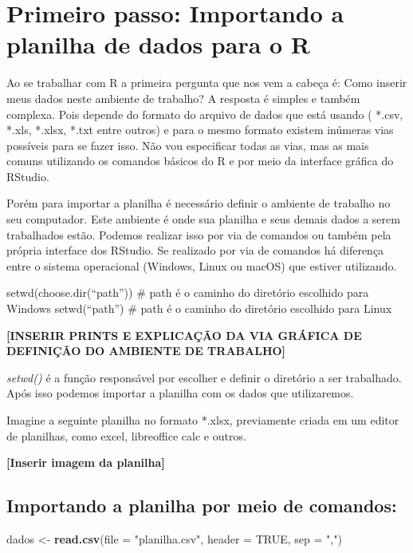 \documentclass[]{book}
\newenvironment{Shaded}{\begin{snugshade}}{\end{snugshade}}
\newcommand{\DataTypeTok}[1]{\textcolor[rgb]{0.13,0.29,0.53}{#1}}
\newcommand{\KeywordTok}[1]{\textcolor[rgb]{0.13,0.29,0.53}{\textbf{#1}}}
\newcommand{\NormalTok}[1]{#1}
\newcommand{\OtherTok}[1]{\textcolor[rgb]{0.56,0.35,0.01}{#1}}
\newcommand{\StringTok}[1]{\textcolor[rgb]{0.31,0.60,0.02}{#1}}
\begin{document}
\hypertarget{primeiro-passo-importando-a-planilha-de-dados-para-o-r}{%
\section{Primeiro passo: Importando a planilha de dados para o R}\label{primeiro-passo-importando-a-planilha-de-dados-para-o-r}}

Ao se trabalhar com R a primeira pergunta que nos vem a cabeça é: Como inserir meus dados neste ambiente de trabalho? A resposta é simples e também complexa. Pois depende do formato do arquivo de dados que está usando ( *.csv, *.xls, *.xlsx, *.txt entre outros) e para o mesmo formato existem inúmeras vias possíveis para se fazer isso. Não vou especificar todas as vias, mas as mais comuns utilizando os comandos básicos do R e por meio da interface gráfica do RStudio.

Porém para importar a planilha é necessário definir o ambiente de trabalho no seu computador. Este ambiente é onde sua planilha e seus demais dados a serem trabalhados estão. Podemos realizar isso por via de comandos ou também pela própria interface dos RStudio. Se realizado por via de comandos há diferença entre o sistema operacional (Windows, Linux ou macOS) que estiver utilizando.

setwd(choose.dir(``path'')) \# path é o caminho do diretório escolhido para Windows
setwd(``path'') \# path é o caminho do diretório escolhido para Linux

\textbf{{[}INSERIR PRINTS E EXPLICAÇÃO DA VIA GRÁFICA DE DEFINIÇÃO DO AMBIENTE DE TRABALHO{]}}

\emph{setwd()} é a função responsável por escolher e definir o diretório a ser trabalhado. Após isso podemos importar a planilha com os dados que utilizaremos.

Imagine a seguinte planilha no formato *.xlsx, previamente criada em um editor de planilhas, como excel, libreoffice calc e outros.

\textbf{{[}Inserir imagem da planilha{]}}

\hypertarget{importando-a-planilha-por-meio-de-comandos}{%
\subsection{Importando a planilha por meio de comandos:}\label{importando-a-planilha-por-meio-de-comandos}}

\begin{Shaded}
\begin{Highlighting}[]
\NormalTok{dados <-}\StringTok{ }\KeywordTok{read.csv}\NormalTok{(}\DataTypeTok{file =} \StringTok{"planilha.csv"}\NormalTok{, }\DataTypeTok{header =} \OtherTok{TRUE}\NormalTok{, }\DataTypeTok{sep =} \StringTok{","}\NormalTok{)}
\end{Highlighting}
\end{Shaded}
\end{document}
